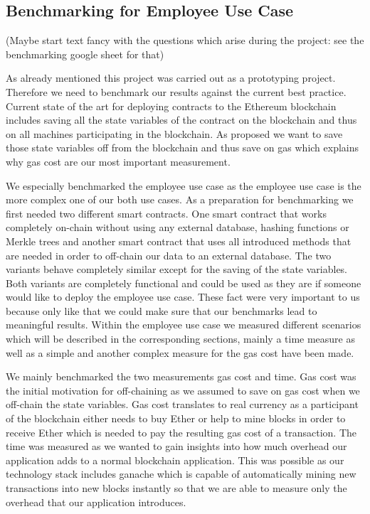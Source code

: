 \subsection{Benchmarking for Employee Use Case}
(Maybe start text fancy with the questions which arise during the project: see the benchmarking google sheet for that)

As already mentioned this project was carried out as a prototyping project. Therefore we need to benchmark our results against the current best practice. Current state of the art for deploying contracts to the Ethereum blockchain includes saving all the state variables of the contract on the blockchain and thus on all machines participating in the blockchain. As proposed we want to save those state variables off from the blockchain and thus save on gas which explains why gas cost are our most important measurement.

We especially benchmarked the employee use case as the employee use case is the more complex one of our both use cases. As a preparation for benchmarking we first needed two different smart contracts. One smart contract that works completely on-chain without using any external database, hashing functions or Merkle trees and another smart contract that uses all introduced methods that are needed in order to off-chain our data to an external database. The two variants behave completely similar except for the saving of the state variables. Both variants are completely functional and could be used as they are if someone would like to deploy the employee use case. These fact were very important to us because only like that we could make sure that our benchmarks lead to meaningful results. Within the employee use case we measured different scenarios which will be described in the corresponding sections, mainly a time measure as well as a simple and another complex measure for the gas cost have been made.

We mainly benchmarked the two measurements gas cost and time. Gas cost was the initial motivation for off-chaining as we assumed to save on gas cost when we off-chain the state variables. Gas cost translates to real currency as a participant of the blockchain either needs to buy Ether or help to mine blocks in order to receive Ether which is needed to pay the resulting gas cost of a transaction. The time was measured as we wanted to gain insights into how much overhead our application adds to a normal blockchain application. This was possible as our technology stack includes ganache which is capable of automatically mining new transactions into new blocks instantly so that we are able to measure only the overhead that our application introduces.

